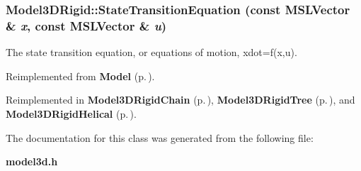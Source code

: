 \subsubsection{ Model3DRigid::State\-Transition\-Equation (const {\bf MSLVector} \& {\em x}, const {\bf MSLVector} \& {\em u})\hspace{0.3cm}{\tt  [virtual]}}\label{class_Model3DRigid_a3}


The state transition equation, or equations of motion, xdot=f(x,u).



Reimplemented from {\bf Model} {\rm (p.\,\pageref{class_Model_a3})}.

Reimplemented in {\bf Model3DRigid\-Chain} {\rm (p.\,\pageref{class_Model3DRigidChain_a2})}, {\bf Model3DRigid\-Tree} {\rm (p.\,\pageref{class_Model3DRigidTree_a2})}, and {\bf Model3DRigid\-Helical} {\rm (p.\,\pageref{class_Model3DRigidHelical_a2})}.

The documentation for this class was generated from the following file:\begin{CompactItemize}
\item 
{\bf model3d.h}\end{CompactItemize}
